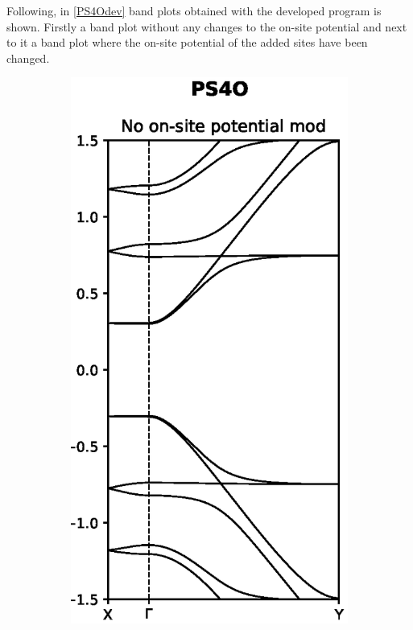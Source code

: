 Following, in \cref{PS4Odev} band plots obtained with the developed program is shown. Firstly a band plot without any changes to the on-site potential and next to it a band plot where the on-site potential of the added sites have been changed.
\begin{figure}[h]
    \centering
    \begin{subfigure}[b]{0.45\textwidth}
    \centering
    \includegraphics[width=\textwidth]{Figures/PS4Onomod.eps}

\end{subfigure}
\end{figure}
